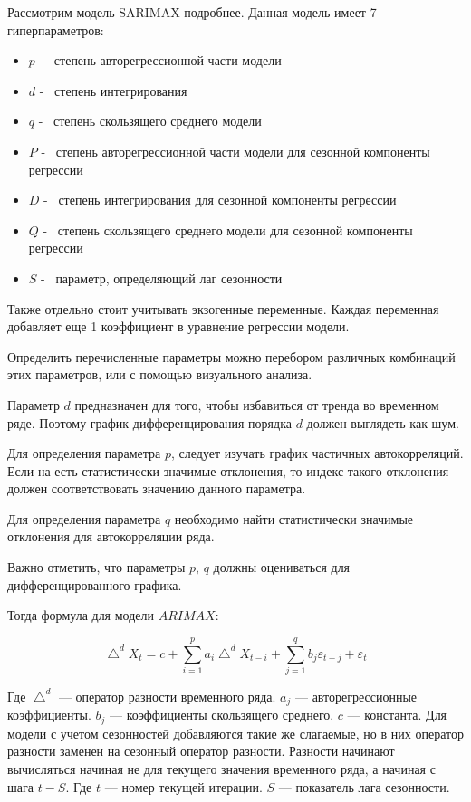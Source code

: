 Рассмотрим модель SARIMAX подробнее. Данная модель имеет 7 гиперпараметров:
\begin{itemize}
	\item $ p $ -~ степень авторегрессионной части модели
	\item $ d $ -~ степень интегрирования
	\item $ q $ -~ степень скользящего среднего модели
	\item $ P $ -~ степень авторегрессионной части модели для сезонной компоненты регрессии
	\item $ D $ -~ степень интегрирования для сезонной компоненты регрессии
	\item $ Q $ -~ степень скользящего среднего модели для сезонной компоненты регрессии
	\item $ S $ -~ параметр, определяющий лаг сезонности
\end{itemize}

Также отдельно стоит учитывать экзогенные переменные. Каждая переменная добавляет еще 1 коэффициент
в уравнение регрессии модели.

Определить перечисленные параметры можно перебором различных комбинаций этих параметров,
или с помощью визуального анализа.

Параметр $ d $ предназначен для того, чтобы избавиться от тренда во временном
ряде. Поэтому график дифференцирования порядка $ d $ должен выглядеть как шум.

Для определения параметра $ p $, следует изучать график частичных автокорреляций.
Если на есть статистически значимые отклонения, то индекс такого отклонения должен соответствовать
значению данного параметра.

Для определения параметра $ q $ необходимо найти статистически значимые отклонения
для автокорреляции ряда.

Важно отметить, что параметры $ p $, $ q $ должны оцениваться для дифференцированного графика.

Тогда формула для модели $ ARIMAX $:

\begin{equation}
	\bigtriangleup^{d} X_t = c + \sum_{i=1}^{p}{ a_i\bigtriangleup^{d}X_{t-i} } + \sum_{j=1}^{q}{ b_{j} \varepsilon_{t-j} + \varepsilon_t }
\end{equation}

\noindent Где $ \bigtriangleup^{d} $ --- оператор разности временного ряда. $ a_{j} $ --- авторегрессионные
коэффициенты.  $ b_{j} $ --- коэффициенты скользящего среднего. $ c $ --- константа.
Для модели с учетом сезонностей добавляются такие же слагаемые, но в них
оператор разности заменен на сезонный оператор разности.
Разности начинают вычисляться начиная не для текущего значения временного ряда,
а начиная с шага $ t - S $. Где $ t $ --- номер текущей итерации. $ S $ --- показатель лага сезонности.

